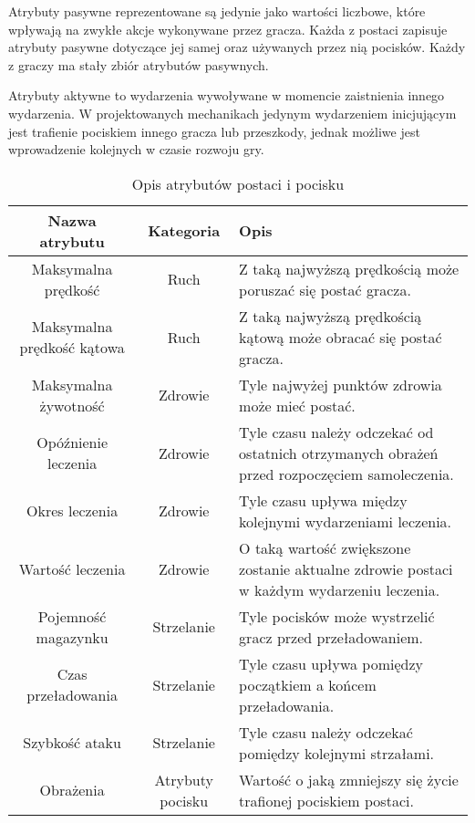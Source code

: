 Atrybuty pasywne reprezentowane są jedynie jako wartości liczbowe, które wpływają na zwykłe akcje wykonywane przez gracza. Każda z postaci zapisuje atrybuty pasywne dotyczące jej samej oraz używanych przez nią pocisków. Każdy z graczy ma stały zbiór atrybutów pasywnych.

Atrybuty aktywne to wydarzenia wywoływane w momencie zaistnienia innego wydarzenia. W projektowanych mechanikach jedynym wydarzeniem inicjującym jest trafienie pociskiem innego gracza lub przeszkody, jednak możliwe jest wprowadzenie kolejnych w czasie rozwoju gry.

\begin{table}
    \small
    \centering
    \caption{Opis atrybutów postaci i pocisku}
    \label{tab:stats_description}
    \begin{tabularx}{\linewidth}{|c|c|X|}
        \hline
        Nazwa atrybutu & Kategoria & Opis\\
        \hline \hline
        Maksymalna prędkość & Ruch & Z taką najwyższą prędkością może poruszać się postać gracza.\\
        \hline
        Maksymalna prędkość kątowa & Ruch & Z taką najwyższą prędkością kątową może obracać się postać gracza.\\
        \hline
        Maksymalna żywotność & Zdrowie & Tyle najwyżej punktów zdrowia może mieć postać. \\
        \hline 
        Opóźnienie leczenia & Zdrowie & Tyle czasu należy odczekać od ostatnich otrzymanych obrażeń przed rozpoczęciem samoleczenia. \\
        \hline
        Okres leczenia & Zdrowie & Tyle czasu upływa między kolejnymi wydarzeniami leczenia. \\
        \hline
        Wartość leczenia & Zdrowie & O taką wartość zwiększone zostanie aktualne zdrowie postaci w każdym wydarzeniu leczenia.\\
        \hline
        Pojemność magazynku & Strzelanie & Tyle pocisków może wystrzelić gracz przed przeładowaniem.\\
        \hline
        Czas przeładowania & Strzelanie & Tyle czasu upływa pomiędzy początkiem a końcem przeładowania. \\
        \hline
        Szybkość ataku & Strzelanie & Tyle czasu należy odczekać pomiędzy kolejnymi strzałami. \\
        \hline
        Obrażenia & Atrybuty pocisku & Wartość o jaką zmniejszy się życie trafionej pociskiem postaci. \\
        \hline

\end{tabularx}
\end{table}
